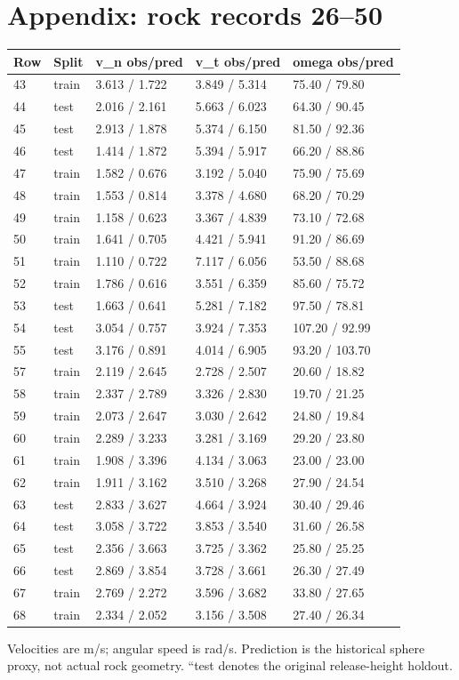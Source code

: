 \documentclass[10pt,a4paper]{article}
\begin{document}
\section*{Appendix: rock records 26--50}
\begin{center}\footnotesize\setlength{\tabcolsep}{4pt}
\begin{tabular}{lllll}
\hline
Row & Split & v\_n obs/pred & v\_t obs/pred & omega obs/pred\\\hline
43 & train & 3.613 / 1.722 & 3.849 / 5.314 & 75.40 / 79.80\\
44 & test & 2.016 / 2.161 & 5.663 / 6.023 & 64.30 / 90.45\\
45 & test & 2.913 / 1.878 & 5.374 / 6.150 & 81.50 / 92.36\\
46 & test & 1.414 / 1.872 & 5.394 / 5.917 & 66.20 / 88.86\\
47 & train & 1.582 / 0.676 & 3.192 / 5.040 & 75.90 / 75.69\\
48 & train & 1.553 / 0.814 & 3.378 / 4.680 & 68.20 / 70.29\\
49 & train & 1.158 / 0.623 & 3.367 / 4.839 & 73.10 / 72.68\\
50 & train & 1.641 / 0.705 & 4.421 / 5.941 & 91.20 / 86.69\\
51 & train & 1.110 / 0.722 & 7.117 / 6.056 & 53.50 / 88.68\\
52 & train & 1.786 / 0.616 & 3.551 / 6.359 & 85.60 / 75.72\\
53 & test & 1.663 / 0.641 & 5.281 / 7.182 & 97.50 / 78.81\\
54 & test & 3.054 / 0.757 & 3.924 / 7.353 & 107.20 / 92.99\\
55 & test & 3.176 / 0.891 & 4.014 / 6.905 & 93.20 / 103.70\\
57 & train & 2.119 / 2.645 & 2.728 / 2.507 & 20.60 / 18.82\\
58 & train & 2.337 / 2.789 & 3.326 / 2.830 & 19.70 / 21.25\\
59 & train & 2.073 / 2.647 & 3.030 / 2.642 & 24.80 / 19.84\\
60 & train & 2.289 / 3.233 & 3.281 / 3.169 & 29.20 / 23.80\\
61 & train & 1.908 / 3.396 & 4.134 / 3.063 & 23.00 / 23.00\\
62 & train & 1.911 / 3.162 & 3.510 / 3.268 & 27.90 / 24.54\\
63 & test & 2.833 / 3.627 & 4.664 / 3.924 & 30.40 / 29.46\\
64 & test & 3.058 / 3.722 & 3.853 / 3.540 & 31.60 / 26.58\\
65 & test & 2.356 / 3.663 & 3.725 / 3.362 & 25.80 / 25.25\\
66 & test & 2.869 / 3.854 & 3.728 / 3.661 & 26.30 / 27.49\\
67 & train & 2.769 / 2.272 & 3.596 / 3.682 & 33.80 / 27.65\\
68 & train & 2.334 / 2.052 & 3.156 / 3.508 & 27.40 / 26.34\\
\hline\end{tabular}\end{center}Velocities are m/s; angular speed is rad/s. Prediction is the historical sphere proxy, not actual rock geometry. ``test denotes the original release-height holdout.
\newpage
\end{document}

